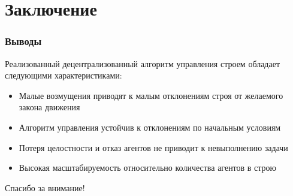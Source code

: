 \documentclass[10pt]{beamer}
\begin{document}
\section{Заключение}
\begin{frame}
	\frametitle{Выводы}
	Реализованный децентрализованный алгоритм управления строем обладает следующими характеристиками:
	\begin{itemize}
		\item Малые возмущения приводят к малым отклонениям строя от желаемого закона движения
		\item Алгоритм управления устойчив к отклонениям по начальным условиям
		\item Потеря целостности и отказ агентов не приводит к невыполнению задачи
		\item Высокая масштабируемость относительно количества агентов в строю  
	\end{itemize}
\end{frame}
\begin{frame}
     \begin{center}
	
	
	\large{Спасибо за внимание!}
	
	\end{center}    
\end{frame}
\end{document}
